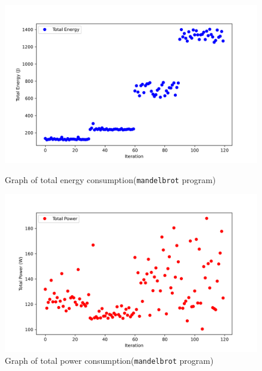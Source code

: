 \vspace{-12pt} %
\setlength{\belowcaptionskip}{-13pt} %
\begin{figure}[htbp]
  \centering
  \begin{center}
    \begin{minipage}[b]{0.49\textwidth}
      \centering
      \includegraphics[width=\linewidth]{img/jx_total_energy_mandelbrot.png}
      \caption{Graph of total energy consumption(\texttt{mandelbrot} program)}
      \label{fig:Graph of total energy consumption for mandelbrot}
    \end{minipage}
    \hfill
    \begin{minipage}[b]{0.49\textwidth}
      \centering
      \includegraphics[width=\linewidth]{img/jx_total_power_mandelbrot.png}
      \caption{Graph of total power consumption(\texttt{mandelbrot} program)}
      \label{fig:Graph of total power consumption for mandelbrot}
    \end{minipage}
  \end{center}
\end{figure}
\vspace{-12pt} %



